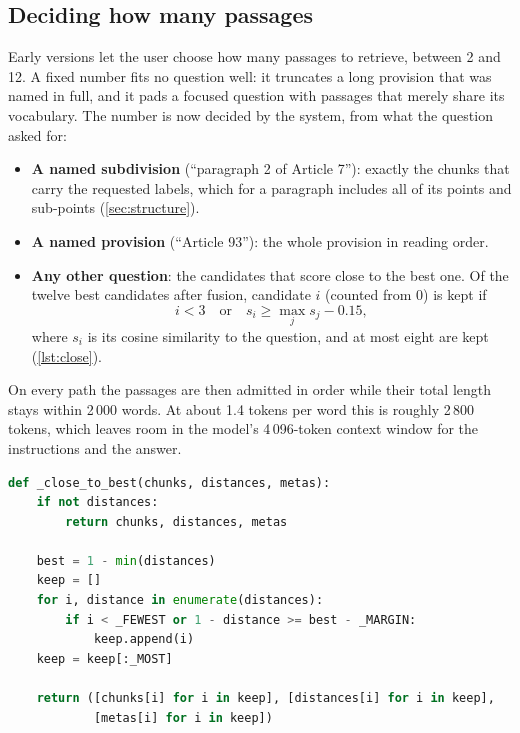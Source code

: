 \subsection{Deciding how many passages}

Early versions let the user choose how many passages to retrieve, between 2
and 12. A fixed number fits no question well: it truncates a long provision
that was named in full, and it pads a focused question with passages that
merely share its vocabulary. The number is now decided by the system, from
what the question asked for:

\begin{itemize}
  \item \textbf{A named subdivision} (``paragraph 2 of Article 7''): exactly
  the chunks that carry the requested labels, which for a paragraph includes
  all of its points and sub-points (\cref{sec:structure}).
  \item \textbf{A named provision} (``Article 93''): the whole provision in
  reading order.
  \item \textbf{Any other question}: the candidates that score close to the
  best one. Of the twelve best candidates after fusion, candidate $i$
  (counted from 0) is kept if
  \begin{equation}
    i < 3 \quad\text{or}\quad s_i \geq \max_j s_j - 0.15,
  \end{equation}
  where $s_i$ is its cosine similarity to the question, and at most eight are
  kept (\cref{lst:close}).
\end{itemize}

On every path the passages are then admitted in order while their total length
stays within 2\,000 words. At about 1.4 tokens per word this is roughly 2\,800
tokens, which leaves room in the model's 4\,096-token context window for the
instructions and the answer.

\begin{lstlisting}[float, language=Python, caption={Keeping the passages close to the
best one (\texttt{retrieval/hybrid.py}).}, label={lst:close}]
def _close_to_best(chunks, distances, metas):
    if not distances:
        return chunks, distances, metas

    best = 1 - min(distances)
    keep = []
    for i, distance in enumerate(distances):
        if i < _FEWEST or 1 - distance >= best - _MARGIN:
            keep.append(i)
    keep = keep[:_MOST]

    return ([chunks[i] for i in keep], [distances[i] for i in keep],
            [metas[i] for i in keep])
\end{lstlisting}

